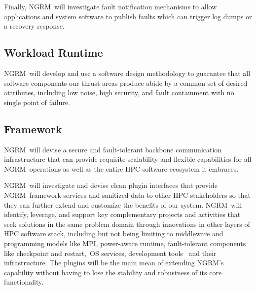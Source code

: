 \documentclass{article}
\newcommand{\ngrm}{NGRM}
\begin{document}
Finally, \ngrm\ will investigate fault notification mechanisms
to allow applications and system software to publish
faults which can trigger log dumps or a recovery response.


\subsection{Workload Runtime}

\ngrm\ will develop and use a software design methodology to
guarantee that all software components our thrust areas produce
abide by a common set of desired attributes, including low noise,
high security, and fault containment with no single point of failure.

\subsection{Framework}
\ngrm\ will devise a secure and fault-tolerant backbone communication
infrastructure that can provide requisite scalability and flexible
capabilities for all \ngrm\ operations as well as the entire HPC
software ecosystem it embraces.

\ngrm\ will investigate and devise clean plugin interfaces that
provide \ngrm\ framework services and sanitized data to other HPC
stakeholders so that they can further extend and customize the benefits
of our system. \ngrm\ will identify, leverage, and support key complementary
projects and activities that seek solutions in the same problem domain
through innovations in other layers of HPC software stack, including but
not being limiting to middleware and programming models like MPI,
power-aware runtime, fault-tolerant components like checkpoint and
restart, OS services, development tools  and their infrastructure.
The plugins will be the main mean of extending \ngrm’s capability
without having to lose the stability and robustness of its core
functionality.













\appendix




\end{document}
